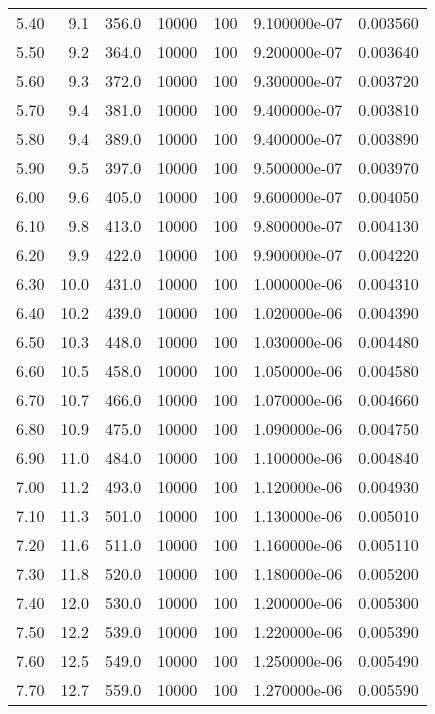 \begin{tabular}{rrrrrrr}
  5.40 &      9.1 &    356.0 & 10000 & 100 & 9.100000e-07 & 0.003560 \\
  5.50 &      9.2 &    364.0 & 10000 & 100 & 9.200000e-07 & 0.003640 \\
  5.60 &      9.3 &    372.0 & 10000 & 100 & 9.300000e-07 & 0.003720 \\
  5.70 &      9.4 &    381.0 & 10000 & 100 & 9.400000e-07 & 0.003810 \\
  5.80 &      9.4 &    389.0 & 10000 & 100 & 9.400000e-07 & 0.003890 \\
  5.90 &      9.5 &    397.0 & 10000 & 100 & 9.500000e-07 & 0.003970 \\
  6.00 &      9.6 &    405.0 & 10000 & 100 & 9.600000e-07 & 0.004050 \\
  6.10 &      9.8 &    413.0 & 10000 & 100 & 9.800000e-07 & 0.004130 \\
  6.20 &      9.9 &    422.0 & 10000 & 100 & 9.900000e-07 & 0.004220 \\
  6.30 &     10.0 &    431.0 & 10000 & 100 & 1.000000e-06 & 0.004310 \\
  6.40 &     10.2 &    439.0 & 10000 & 100 & 1.020000e-06 & 0.004390 \\
  6.50 &     10.3 &    448.0 & 10000 & 100 & 1.030000e-06 & 0.004480 \\
  6.60 &     10.5 &    458.0 & 10000 & 100 & 1.050000e-06 & 0.004580 \\
  6.70 &     10.7 &    466.0 & 10000 & 100 & 1.070000e-06 & 0.004660 \\
  6.80 &     10.9 &    475.0 & 10000 & 100 & 1.090000e-06 & 0.004750 \\
  6.90 &     11.0 &    484.0 & 10000 & 100 & 1.100000e-06 & 0.004840 \\
  7.00 &     11.2 &    493.0 & 10000 & 100 & 1.120000e-06 & 0.004930 \\
  7.10 &     11.3 &    501.0 & 10000 & 100 & 1.130000e-06 & 0.005010 \\
  7.20 &     11.6 &    511.0 & 10000 & 100 & 1.160000e-06 & 0.005110 \\
  7.30 &     11.8 &    520.0 & 10000 & 100 & 1.180000e-06 & 0.005200 \\
  7.40 &     12.0 &    530.0 & 10000 & 100 & 1.200000e-06 & 0.005300 \\
  7.50 &     12.2 &    539.0 & 10000 & 100 & 1.220000e-06 & 0.005390 \\
  7.60 &     12.5 &    549.0 & 10000 & 100 & 1.250000e-06 & 0.005490 \\
  7.70 &     12.7 &    559.0 & 10000 & 100 & 1.270000e-06 & 0.005590 \\

\end{tabular}

